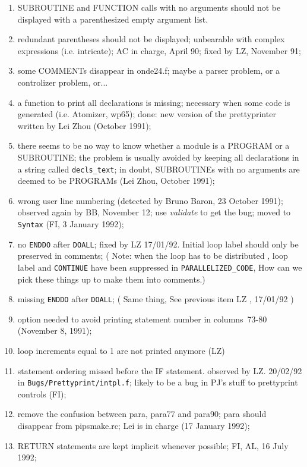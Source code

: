 \begin{enumerate}

  \item SUBROUTINE and FUNCTION calls with no arguments should not be
	displayed with a parenthesized empty argument list.

  \item redundant parentheses should not be displayed; unbearable with
	complex expressions (i.e. intricate); 
	AC in charge, April 90; fixed by LZ, November 91;

  \item some COMMENTs disappear in onde24.f; maybe a parser problem,
	or a controlizer problem, or...

  \item a function to print all declarations is missing; necessary when some
	code is generated (i.e. Atomizer, wp65); done: new version of the
	prettyprinter written by Lei Zhou (October 1991);

  \item there seems to be no way to know whether a module is a PROGRAM
	or a SUBROUTINE; the problem is usually avoided by keeping all
	declarations in a string called \verb+decls_text+; in doubt,
	SUBROUTINEs with no arguments are deemed to be PROGRAMs (Lei Zhou,
	October 1991);

  \item wrong user line numbering (detected by Bruno Baron, 23 October 1991);
	observed again by BB, November 12; use {\em validate} to get
	the bug; moved to \verb+Syntax+ (FI, 3 January 1992);

  \item {}
	no \verb+ENDDO+ after \verb+DOALL+; fixed by LZ 17/01/92. 
	Initial loop label should only be preserved in comments;
	( Note: when the loop has to be distributed , loop label and
	\verb+CONTINUE+ have been suppressed in 
	\verb+PARALLELIZED_CODE+, How can
	we pick these things up to make them into comments.)

  \item {} missing \verb+ENDDO+ after \verb+DOALL+;
	( Same thing, See previous item LZ , 17/01/92 )

  \item {} option needed to avoid printing statement number in
	columns~73-80 (November 8, 1991);

  \item loop increments equal to 1 are not printed anymore (LZ)

  \item statement ordering missed before the IF statement.
	observed by LZ. 20/02/92 in \verb+Bugs/Prettyprint/intpl.f+;
	likely to be a bug in PJ's stuff to prettyprint controls (FI);

  \item remove the confusion between para, para77 and para90; para should
	disappear from pipsmake.rc; Lei is in charge (17 January 1992);

  \item RETURN statements are kept implicit whenever possible;
	FI, AL, 16 July 1992;

\end{enumerate}

